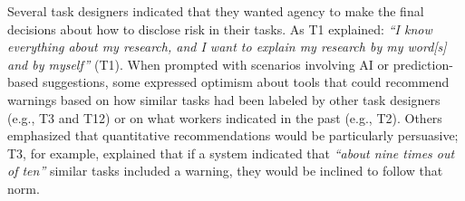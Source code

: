 Several task designers indicated that they wanted agency to make the final decisions about how to disclose risk in their tasks. As T1 explained: \textit{``I know everything about my research, and I want to explain my research by my word[s] and by myself''} (T1). 
When prompted with scenarios involving  AI or prediction-based suggestions, some expressed optimism about tools that could recommend warnings based on how similar tasks had been labeled by other task designers (e.g., T3 and T12) or on what workers indicated in the past (e.g., T2). Others emphasized that quantitative recommendations would be particularly persuasive; T3, for example, explained that if a system indicated that \textit{``about nine times out of ten''} similar tasks included a warning, they would be inclined to follow that norm.

